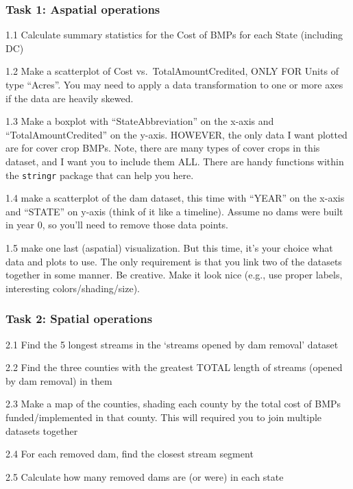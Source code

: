 \documentclass[]{article}
\begin{document}
\subsubsection{Task 1: Aspatial
operations}\label{task-1-aspatial-operations}

1.1 Calculate summary statistics for the Cost of BMPs for each State
(including DC)

1.2 Make a scatterplot of Cost vs.~TotalAmountCredited, ONLY FOR Units
of type ``Acres''. You may need to apply a data transformation to one or
more axes if the data are heavily skewed.

1.3 Make a boxplot with ``StateAbbreviation'' on the x-axis and
``TotalAmountCredited'' on the y-axis. HOWEVER, the only data I want
plotted are for cover crop BMPs. Note, there are many types of cover
crops in this dataset, and I want you to include them ALL. There are
handy functions within the \texttt{stringr} package that can help you
here.

1.4 make a scatterplot of the dam dataset, this time with ``YEAR'' on
the x-axis and ``STATE'' on y-axis (think of it like a timeline). Assume
no dams were built in year 0, so you'll need to remove those data
points.

1.5 make one last (aspatial) visualization. But this time, it's your
choice what data and plots to use. The only requirement is that you link
two of the datasets together in some manner. Be creative. Make it look
nice (e.g., use proper labels, interesting colors/shading/size).

\subsubsection{Task 2: Spatial
operations}\label{task-2-spatial-operations}

2.1 Find the 5 longest streams in the `streams opened by dam removal'
dataset

2.2 Find the three counties with the greatest TOTAL length of streams
(opened by dam removal) in them

2.3 Make a map of the counties, shading each county by the total cost of
BMPs funded/implemented in that county. This will required you to join
multiple datasets together

2.4 For each removed dam, find the closest stream segment

2.5 Calculate how many removed dams are (or were) in each state
\end{document}
